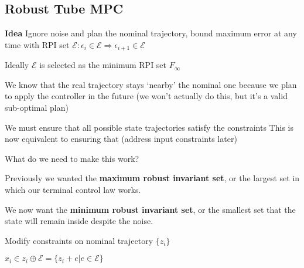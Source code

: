 \subsection{Robust Tube MPC}

\textbf{Idea}
Ignore noise and plan the nominal trajectory,
bound maximum error at any time with RPI set
$\mathcal{E}: \epsilon_i \in \mathcal{E}  ⇒ \epsilon_{i+1} \in \mathcal{E}$

Ideally $\mathcal{E}$ is selected as the minimum RPI set $F_\infty$

We know that the real trajectory stays ‘nearby’ the nominal one%
because we plan to apply the controller%
in the future%
(we won’t actually do this, but it’s a valid sub-optimal plan)

We must ensure that all possible state trajectories satisfy the constraints
This is now equivalent to ensuring that %
(address input constraints later)


What do we need to make this work?


Previously we wanted the \textbf{maximum robust invariant set}, or the largest set in
which our terminal control law works.

We now want the \textbf{minimum robust invariant set}, or the smallest set that the
state will remain inside despite the noise.

Modify constraints on nominal trajectory $\{z_i\}$

$x_i \in z_i \oplus \mathcal{E} =
	\{z_i + e | e \in \mathcal{E}\}$

